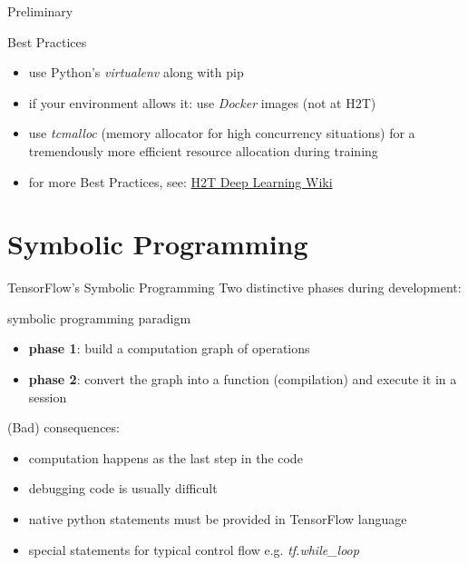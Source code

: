 \documentclass[18pt]{beamer}
\begin{document}
\begin{frame}{Preliminary}
\begin{block}{Best Practices}
\begin{itemize}
\item use Python's \emph{virtualenv} along with pip
\pause
\item if your environment allows it: use \emph{Docker} images (not at H2T)
\pause
\item use \emph{tcmalloc} (memory allocator for high concurrency situations) for a tremendously more efficient resource allocation during training
\end{itemize}
\end{block}
\begin{itemize}
\item for more Best Practices, see: \textcolor{kitgreen}{\href{https://i61wiki.itec.uka.de/redmine/projects/deeplearning-h2t/wiki/Best_Practices}{H2T Deep Learning Wiki}}
\end{itemize}
\end{frame}


\section{Symbolic Programming}
\begin{frame}{TensorFlow's Symbolic Programming}
Two distinctive phases during development:
\begin{block}{symbolic programming paradigm}
\begin{itemize}
\item \textbf{phase 1}: build a computation graph of operations
\pause
\item \textbf{phase 2}: convert the graph into a function (compilation) and execute it in a session
\pause
\end{itemize}
\end{block}
(Bad) consequences:
\begin{itemize}
\item computation happens as the last step in the code
\pause
\item debugging code is usually difficult
\pause
\item native python statements must be provided in TensorFlow language
\pause
\item special statements for typical control flow e.g. \textit{tf.while\_loop}
\end{itemize}
\end{frame}
\end{document}
